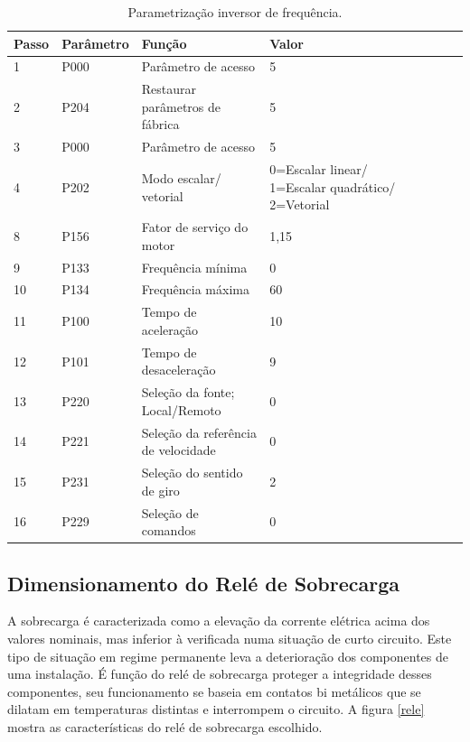 \documentclass[a4paper, 12pt,oneside, english, brazil]{abntex2}
\begin{document}
\begin{table}[H]
\centering
\begin{tabular}{||lp{2.0cm}||lp{2.0cm}||lp{4.0cm}||lp{6.0cm}||}
\hline
Passo &	Parâmetro	& Função	& Valor \\\hline 
1	& P000	& Parâmetro de acesso	& 5 \\\hline
2	& P204	& Restaurar parâmetros de fábrica	& 5 \\\hline
3 & P000	& Parâmetro de acesso	& 5 \\\hline
4 & P202	& Modo escalar/ vetorial	& 0=Escalar linear/ 1=Escalar quadrático/ 2=Vetorial \\\hline
8	& P156 &	Fator de serviço do motor &	1,15 \\\hline
9	& P133	& Frequência mínima 	& 0 \\\hline
10	& P134	& Frequência máxima	& 60 \\\hline
11	& P100	& Tempo de aceleração	& 10 \\\hline
12	& P101	& Tempo de desaceleração & 	9 \\\hline
13	& P220	& Seleção da fonte; Local/Remoto	& 0 \\\hline
14	& P221	 & Seleção da referência de velocidade &	0 \\\hline
15	& P231	& Seleção do sentido de giro &	2 \\\hline
16 &	P229 &	Seleção de comandos	& 0 \\\hline
\end{tabular}

\caption{ Parametrização inversor de frequência. }
\label{param}
\end{table}

\subsection{Dimensionamento do Relé de Sobrecarga}
A sobrecarga é caracterizada como a elevação da corrente elétrica acima dos valores nominais, mas inferior à verificada numa situação de curto circuito. Este tipo de situação em regime permanente leva a deterioração dos componentes de uma instalação.
É função do relé de sobrecarga proteger a integridade desses componentes, seu funcionamento se baseia em contatos bi metálicos que se dilatam em temperaturas distintas e interrompem o circuito.  
A figura \ref{rele} mostra as características do relé de sobrecarga escolhido. 
\end{document}
